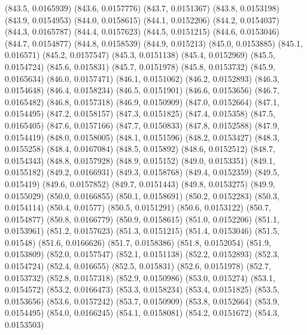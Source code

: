 {					(843.5, 0.0165939)
					(843.6, 0.0157776)
					(843.7, 0.0151367)
					(843.8, 0.0153198)
					(843.9, 0.0154953)
					(844.0, 0.0158615)
					(844.1, 0.0152206)
					(844.2, 0.0154037)
					(844.3, 0.0165787)
					(844.4, 0.0157623)
					(844.5, 0.0151215)
					(844.6, 0.0153046)
					(844.7, 0.0154877)
					(844.8, 0.0158539)
					(844.9, 0.015213)
					(845.0, 0.0153885)
					(845.1, 0.016571)
					(845.2, 0.0157547)
					(845.3, 0.0151138)
					(845.4, 0.0152969)
					(845.5, 0.0154724)
					(845.6, 0.015831)
					(845.7, 0.0151978)
					(845.8, 0.0153732)
					(845.9, 0.0165634)
					(846.0, 0.0157471)
					(846.1, 0.0151062)
					(846.2, 0.0152893)
					(846.3, 0.0154648)
					(846.4, 0.0158234)
					(846.5, 0.0151901)
					(846.6, 0.0153656)
					(846.7, 0.0165482)
					(846.8, 0.0157318)
					(846.9, 0.0150909)
					(847.0, 0.0152664)
					(847.1, 0.0154495)
					(847.2, 0.0158157)
					(847.3, 0.0151825)
					(847.4, 0.015358)
					(847.5, 0.0165405)
					(847.6, 0.0157166)
					(847.7, 0.0150833)
					(847.8, 0.0152588)
					(847.9, 0.0154419)
					(848.0, 0.0158005)
					(848.1, 0.0151596)
					(848.2, 0.0153427)
					(848.3, 0.0155258)
					(848.4, 0.0167084)
					(848.5, 0.015892)
					(848.6, 0.0152512)
					(848.7, 0.0154343)
					(848.8, 0.0157928)
					(848.9, 0.015152)
					(849.0, 0.0153351)
					(849.1, 0.0155182)
					(849.2, 0.0166931)
					(849.3, 0.0158768)
					(849.4, 0.0152359)
					(849.5, 0.015419)
					(849.6, 0.0157852)
					(849.7, 0.0151443)
					(849.8, 0.0153275)
					(849.9, 0.0155029)
					(850.0, 0.0166855)
					(850.1, 0.0158691)
					(850.2, 0.0152283)
					(850.3, 0.0154114)
					(850.4, 0.01577)
					(850.5, 0.0151291)
					(850.6, 0.0153122)
					(850.7, 0.0154877)
					(850.8, 0.0166779)
					(850.9, 0.0158615)
					(851.0, 0.0152206)
					(851.1, 0.0153961)
					(851.2, 0.0157623)
					(851.3, 0.0151215)
					(851.4, 0.0153046)
					(851.5, 0.01548)
					(851.6, 0.0166626)
					(851.7, 0.0158386)
					(851.8, 0.0152054)
					(851.9, 0.0153809)
					(852.0, 0.0157547)
					(852.1, 0.0151138)
					(852.2, 0.0152893)
					(852.3, 0.0154724)
					(852.4, 0.016655)
					(852.5, 0.015831)
					(852.6, 0.0151978)
					(852.7, 0.0153732)
					(852.8, 0.0157318)
					(852.9, 0.0150986)
					(853.0, 0.015274)
					(853.1, 0.0154572)
					(853.2, 0.0166473)
					(853.3, 0.0158234)
					(853.4, 0.0151825)
					(853.5, 0.0153656)
					(853.6, 0.0157242)
					(853.7, 0.0150909)
					(853.8, 0.0152664)
					(853.9, 0.0154495)
					(854.0, 0.0166245)
					(854.1, 0.0158081)
					(854.2, 0.0151672)
					(854.3, 0.0153503)
}
